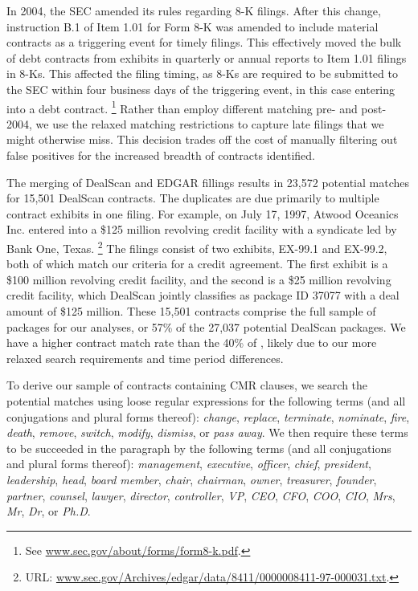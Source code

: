 \documentclass[12pt]{article}
\begin{document}
\begin{appendices}
In 2004, the SEC amended its rules regarding 8-K filings.
After this change, instruction B.1 of Item 1.01 for Form 8-K was amended to include material contracts as a triggering event for timely filings.
This effectively moved the bulk of debt contracts from exhibits in quarterly or annual reports to Item 1.01 filings in 8-Ks.
This affected the filing timing, as 8-Ks are required to be submitted to the SEC within four business days of the triggering event, in this case entering into a debt contract.%
    \footnote{See \href{https://www.sec.gov/about/forms/form8-k.pdf}{www.sec.gov/about/forms/form8-k.pdf}.}
Rather than employ different matching pre- and post-2004, we use the relaxed matching restrictions to capture late filings that we might otherwise miss.
This decision trades off the cost of manually filtering out false positives for the increased breadth of contracts identified.


The merging of DealScan and EDGAR fillings results in 23,572 potential matches for 15,501 DealScan contracts.
The duplicates are due primarily to multiple contract exhibits in one filing.
For example, on July 17, 1997, Atwood Oceanics Inc. entered into a \$125 million revolving credit facility with a syndicate led by Bank One, Texas.%
    \footnote{URL: \href{http://www.sec.gov/Archives/edgar/data/8411/0000008411-97-000031.txt}{www.sec.gov/Archives/edgar/data/8411/0000008411-97-000031.txt}.}
The filings consist of two exhibits, EX-99.1 and EX-99.2, both of which match our criteria for a credit agreement.
The first exhibit is a \$100 million revolving credit facility, and the second is a \$25 million revolving credit facility, which DealScan jointly classifies as package ID 37077 with a deal amount of \$125 million.
These 15,501 contracts comprise the full sample of packages for our analyses, or 57\% of the 27,037 potential DealScan packages.
We have a higher contract match rate than the 40\% of \cite{Nini_2009}, likely due to our more relaxed search requirements and time period differences.


To derive our sample of contracts containing CMR clauses, we search the potential matches using loose regular expressions for the following terms (and all conjugations and plural forms thereof): \textit{change}, \textit{replace}, \textit{terminate}, \textit{nominate}, \textit{fire}, \textit{death}, \textit{remove}, \textit{switch}, \textit{modify}, \textit{dismiss}, or \textit{pass away}.
We then require these terms to be succeeded in the paragraph by the following terms (and all conjugations and plural forms thereof): \textit{management}, \textit{executive}, \textit{officer}, \textit{chief}, \textit{president}, \textit{leadership}, \textit{head}, \textit{board member}, \textit{chair}, \textit{chairman}, \textit{owner}, \textit{treasurer}, \textit{founder}, \textit{partner}, \textit{counsel}, \textit{lawyer}, \textit{director}, \textit{controller}, \textit{VP}, \textit{CEO}, \textit{CFO}, \textit{COO}, \textit{CIO}, \textit{Mrs}, \textit{Mr}, \textit{Dr}, or \textit{Ph.D}.



\end{appendices}
\end{document}
